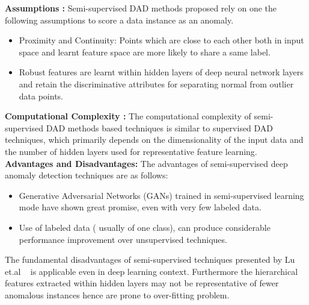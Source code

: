 \textbf{Assumptions : }
Semi-supervised DAD methods proposed rely on one the following assumptions to score a data instance as an anomaly.
\begin{itemize}
 \item  Proximity and Continuity: Points which are close to each other both in input space  and learnt feature space are more likely to share a same label.
  \item Robust features are learnt within hidden layers of deep neural network layers and retain the discriminative attributes for separating normal from outlier data points.
\end{itemize}

\textbf{Computational Complexity :} 
The computational complexity of semi-supervised DAD methods based techniques is similar to supervised DAD techniques, which primarily depends on the dimensionality of the input data and the number of hidden layers used for representative feature learning.\\

\textbf{Advantages and Disadvantages:}
The advantages of semi-supervised deep anomaly detection techniques are as follows:
\begin{itemize}
\item  Generative Adversarial Networks (GANs) trained in semi-supervised learning mode have shown great promise, even with very few labeled data.
\item  Use of labeled data ( usually of one class), can produce considerable performance improvement   over unsupervised techniques.
\end{itemize}
The fundamental disadvantages of semi-supervised techniques presented by Lu et.al ~\cite{lu2009fundamental} is applicable even in deep learning context. Furthermore the hierarchical features extracted within hidden layers may not be representative of fewer anomalous instances hence are prone to over-fitting problem.










